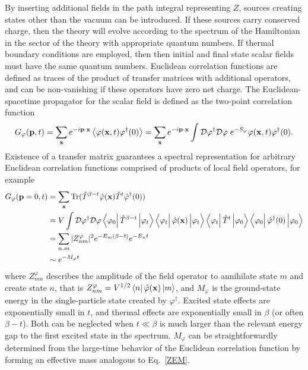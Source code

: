 By inserting additional fields in the path integral representing $Z$, sources creating states other than the vacuum can be introduced.
If these sources carry conserved charge, then the theory will evolve according to the spectrum of the Hamiltonian in the sector of the theory with appropriate quantum numbers.
If thermal boundary conditions are employed, then then initial and final state scalar fields must have the same quantum numbers.
Euclidean correlation functions are defined as traces of the product of transfer matrices with additional operators, and can be non-vanishing if these operators have zero net charge.
The Euclidean-spacetime propagator for the scalar field is defined as the two-point correlation function
\begin{equation}
  \begin{split}
    G_\varphi(\mathbf{p},t) = \sum_{\mathbf{x}} e^{-i\mathbf{p}\cdot \mathbf{x}} \left< \varphi(\mathbf{x},t)\varphi^\dagger(0) \right> = \sum_{\mathbf{x}} e^{-i\mathbf{p}\cdot \mathbf{x}} \int \mathcal{D}\varphi^\dagger\mathcal{D}\varphi \;e^{-S_\varphi}\varphi(\mathbf{x},t)\varphi^\dagger(0).
  \end{split}\label{eq:scalar2ptdef}
\end{equation}
Existence of a transfer matrix guarantees a spectral representation for arbitrary Euclidean correlation functions comprised of products of local field operators, for example
\begin{equation}
  \begin{split}
    G_\varphi(\v{p}=0,t) &= \sum_\v{x}   \tr(\hat{T}^{\beta-t} \hat{\varphi}(\v{x})\hat{T}^t \hat{\varphi}^\dagger(0)) \\
    &= V \int \mathcal{D}\varphi^\dagger \mathcal{D}\varphi \mbraket{\varphi_0}{\hat{T}^{\beta-t}}{\varphi_t} \mbraket{\varphi_t}{\vphantom{\hat{T}^t}\hat{\varphi}(\v{x})}{\varphi_t} \mbraket{\varphi_t}{\hat{T}^t}{\varphi_0} \mbraket{\varphi_0}{\vphantom{\hat{T}^t}\hat{\varphi}^\dagger(0)}{\varphi_0}\\
    &= \sum_{n,m} |Z_{nm}^\varphi|^2 e^{-E_m(\beta-t)} e^{-E_n t} \\
    &\sim e^{-M_\varphi t}
  \end{split}
\end{equation}
where $Z_{nm}^\varphi$ describes the amplitude of the field operator to annihilate state $m$ and create state $n$, that is $Z_{nm}^\varphi=V^{1/2} \mbraket{n}{\hat{\varphi}(\v{x})}{m}$, and $M_\varphi$ is the ground-state energy in the single-particle state created by $\varphi^\dagger$.
Excited state effects are exponentially small in $t$, and thermal effects are exponentially small in $\beta$ (or often $\beta - t$).
Both can be neglected when $t \ll \beta$ is much larger than the relevant energy gap to the first excited state in the spectrum.
$M_\varphi$ can be straightforwardly determined from the large-time behavior of the Euclidean correlation function by forming an effective mass analogous to Eq.~\eqref{ZEM}.

